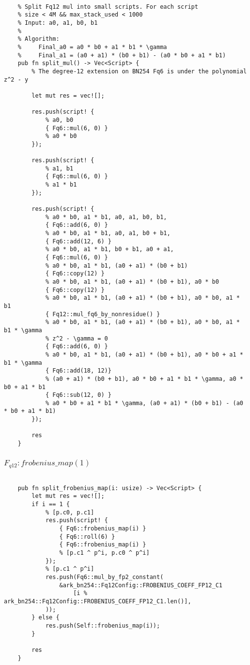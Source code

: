 \begin{lstlisting}

    % Split Fq12 mul into small scripts. For each script
    % size < 4M && max_stack_used < 1000
    % Input: a0, a1, b0, b1
    %
    % Algorithm:
    %     Final_a0 = a0 * b0 + a1 * b1 * \gamma
    %     Final_a1 = (a0 + a1) * (b0 + b1) - (a0 * b0 + a1 * b1)
    pub fn split_mul() -> Vec<Script> {
        % The degree-12 extension on BN254 Fq6 is under the polynomial z^2 - y

        let mut res = vec![];

        res.push(script! {
            % a0, b0
            { Fq6::mul(6, 0) }
            % a0 * b0
        });

        res.push(script! {
            % a1, b1
            { Fq6::mul(6, 0) }
            % a1 * b1
        });

        res.push(script! {
            % a0 * b0, a1 * b1, a0, a1, b0, b1,
            { Fq6::add(6, 0) }
            % a0 * b0, a1 * b1, a0, a1, b0 + b1,
            { Fq6::add(12, 6) }
            % a0 * b0, a1 * b1, b0 + b1, a0 + a1,
            { Fq6::mul(6, 0) }
            % a0 * b0, a1 * b1, (a0 + a1) * (b0 + b1)
            { Fq6::copy(12) }
            % a0 * b0, a1 * b1, (a0 + a1) * (b0 + b1), a0 * b0
            { Fq6::copy(12) }
            % a0 * b0, a1 * b1, (a0 + a1) * (b0 + b1), a0 * b0, a1 * b1
            { Fq12::mul_fq6_by_nonresidue() }
            % a0 * b0, a1 * b1, (a0 + a1) * (b0 + b1), a0 * b0, a1 * b1 * \gamma
            % z^2 - \gamma = 0
            { Fq6::add(6, 0) }
            % a0 * b0, a1 * b1, (a0 + a1) * (b0 + b1), a0 * b0 + a1 * b1 * \gamma
            { Fq6::add(18, 12)}
            % (a0 + a1) * (b0 + b1), a0 * b0 + a1 * b1 * \gamma, a0 * b0 + a1 * b1
            { Fq6::sub(12, 0) }
            % a0 * b0 + a1 * b1 * \gamma, (a0 + a1) * (b0 + b1) - (a0 * b0 + a1 * b1)
        });

        res
    }

\end{lstlisting}

\subsubsection{$F_{q12} : frobenius\_map(1)$}

\begin{lstlisting}

    pub fn split_frobenius_map(i: usize) -> Vec<Script> {
        let mut res = vec![];
        if i == 1 {
            % [p.c0, p.c1]
            res.push(script! {
                { Fq6::frobenius_map(i) }
                { Fq6::roll(6) }
                { Fq6::frobenius_map(i) }
                % [p.c1 ^ p^i, p.c0 ^ p^i]
            });
            % [p.c1 ^ p^i]
            res.push(Fq6::mul_by_fp2_constant(
                &ark_bn254::Fq12Config::FROBENIUS_COEFF_FP12_C1
                    [i % ark_bn254::Fq12Config::FROBENIUS_COEFF_FP12_C1.len()],
            ));
        } else {
            res.push(Self::frobenius_map(i));
        }

        res
    }
\end{lstlisting}


